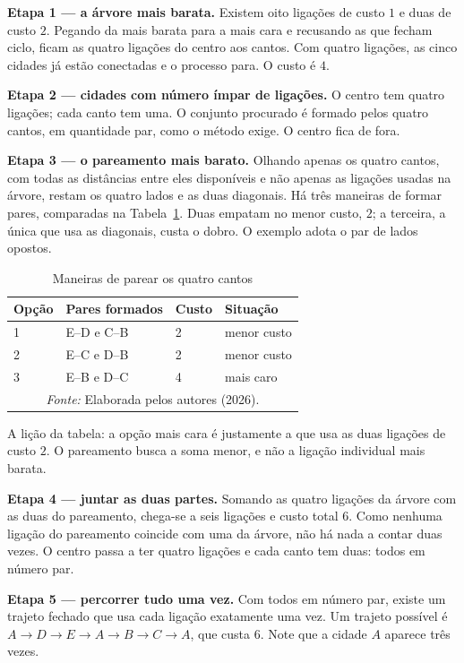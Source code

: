 \textbf{Etapa 1 --- a árvore mais barata.} Existem oito ligações de custo $1$ e
duas de custo $2$. Pegando da mais barata para a mais cara e recusando as que
fecham ciclo, ficam as quatro ligações do centro aos cantos. Com quatro
ligações, as cinco cidades já estão conectadas e o processo para. O custo é $4$.

\textbf{Etapa 2 --- cidades com número ímpar de ligações.} O centro tem quatro
ligações; cada canto tem uma. O conjunto procurado é formado pelos quatro
cantos, em quantidade par, como o método exige. O centro fica de fora.

\textbf{Etapa 3 --- o pareamento mais barato.} Olhando apenas os quatro cantos,
com todas as distâncias entre eles disponíveis e não apenas as ligações usadas
na árvore, restam os quatro lados e as duas diagonais. Há três maneiras de
formar pares, comparadas na Tabela~\ref{tab:emparelhamentos-quadrado}. Duas
empatam no menor custo, $2$; a terceira, a única que usa as diagonais, custa o
dobro. O exemplo adota o par de lados opostos.

\begin{table}[!ht]
	\centering
	\caption{Maneiras de parear os quatro cantos}
	\label{tab:emparelhamentos-quadrado}
	\begin{tabular}{p{1.5cm}p{3.0cm}p{2.6cm}p{3.2cm}}
		\hline
		\textbf{Opção} & \textbf{Pares formados} & \textbf{Custo} & \textbf{Situação} \\
		\hline
		1 & E--D e C--B & 2 & menor custo \\
		2 & E--C e D--B & 2 & menor custo \\
		3 & E--B e D--C & 4 & mais caro \\
		\hline
		\multicolumn{4}{c}{\footnotesize\textit{Fonte:} Elaborada pelos autores (2026).} \\
	\end{tabular}
\end{table}

A lição da tabela: a opção mais cara é justamente a que usa as duas ligações de
custo $2$. O pareamento busca a soma menor, e não a ligação individual mais
barata.

\textbf{Etapa 4 --- juntar as duas partes.} Somando as quatro ligações da árvore
com as duas do pareamento, chega-se a seis ligações e custo total $6$. Como
nenhuma ligação do pareamento coincide com uma da árvore, não há nada a contar
duas vezes. O centro passa a ter quatro ligações e cada canto tem duas: todos em
número par.

\textbf{Etapa 5 --- percorrer tudo uma vez.} Com todos em número par, existe um
trajeto fechado que usa cada ligação exatamente uma vez. Um trajeto possível é
$A \to D \to E \to A \to B \to C \to A$, que custa $6$. Note que a cidade $A$
aparece três vezes.

